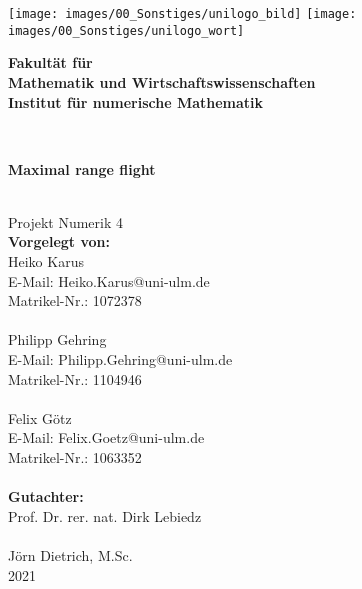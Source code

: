 \documentclass[
a4paper,
11pt,
headsepline,           %
oneside,               %
numbers=noenddot,	   %
bibliography=totoc,    %
]{scrbook}
\makeatletter
\newcommand{\Heiko}{Heiko Karus}
\newcommand{\Philipp}{Philipp Gehring}
\newcommand{\Felix}{Felix Götz}
\newcommand{\Hemail}{Heiko.Karus@uni-ulm.de}
\newcommand{\Pemail}{Philipp.Gehring@uni-ulm.de}
\newcommand{\Femail}{Felix.Goetz@uni-ulm.de}
\newcommand{\Hmatnr}{1072378}
\newcommand{\Pmatnr}{1104946}
\newcommand{\Fmatnr}{1063352}
\newcommand{\titel}{Maximal range flight}
\newcommand{\jahr}{2021}
\newcommand{\gutachterA}{Prof. Dr. rer. nat. Dirk Lebiedz}
\newcommand{\gutachterB}{Jörn Dietrich, M.Sc.}
\newcommand{\fakultaet}{Mathematik und Wirtschaftswissenschaften}
\newcommand{\institut}{Institut für numerische Mathematik}
\makeatother
\begin{document}

\frontmatter

\thispagestyle{empty}
\begin{addmargin*}[4mm]{-10mm}

\texttt{[image: images/00\_Sonstiges/unilogo\_bild]}
\hfill
\texttt{[image: images/00\_Sonstiges/unilogo\_wort]}\\[2em]



{\footnotesize
\hspace*{130mm}\parbox[t]{35mm}{
\bfseries Fakultät für\\
\fakultaet\\
\mdseries \institut
}\\[2cm]

\parbox{140mm}{\bfseries \LARGE \titel}\\[2.5em]
{\footnotesize Projekt Numerik 4}\\[2em]

{\footnotesize \bfseries Vorgelegt von:}\\
{\footnotesize \Heiko \\ E-Mail: \Hemail \\ Matrikel-Nr.: \Hmatnr}\\ \\%
{\footnotesize \Philipp \\ E-Mail: \Pemail \\ Matrikel-Nr.: \Pmatnr}\\ \\%
{\footnotesize \Felix \\ E-Mail: \Femail \\ Matrikel-Nr.: \Fmatnr}\\ \\[2em]

{\footnotesize \bfseries Gutachter:}\\                     
{\footnotesize \gutachterA}\\ \\%
{\footnotesize \gutachterB}\\[2em]

{\footnotesize \jahr}
}
\end{addmargin*}
\end{document}

